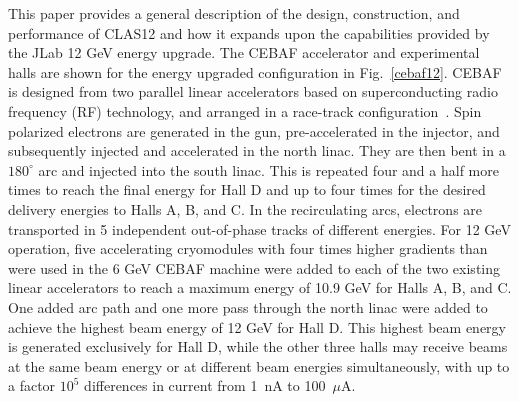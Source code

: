 \documentclass[final,3p,times,twocolumn,authoryear]{elsarticle}
\begin{document}
 This paper provides a general description of the design, construction, and performance of CLAS12 and how it expands upon the capabilities provided by the JLab 12 GeV energy upgrade.   
The CEBAF accelerator and experimental halls are shown for the energy upgraded configuration in Fig.~\ref{cebaf12}. CEBAF is designed from 
two parallel linear accelerators based 
on superconducting radio frequency (RF) technology, and arranged in a race-track configuration~\cite{Leemann:2001dg}.
 Spin polarized electrons are generated in the gun,  
pre-accelerated in the injector, and subsequently injected and accelerated in the north linac. They are then bent in a $180^\circ$ arc and injected 
into the south linac. This is repeated four and a half more times to reach the final energy for Hall D and 
up to four times  for the desired delivery energies to Halls A, B, and C. In the recirculating arcs, electrons are transported in 5 
independent out-of-phase tracks of different energies. For 12 GeV operation, five accelerating cryomodules 
with four times higher gradients than were used in the 6 GeV CEBAF machine were added to each of the two 
existing linear accelerators to reach a maximum energy of 10.9 GeV for Halls A, B, and C. One added arc path and one 
more pass through the north linac were added to achieve the highest beam energy of 12 GeV for Hall D. 
This highest beam energy is generated exclusively for Hall D, while the other three halls may receive 
beams at the same beam energy or at different beam energies simultaneously, with up to a factor $10^5$ 
differences in current from 1~nA to 100~$\mu$A.
\end{document}
